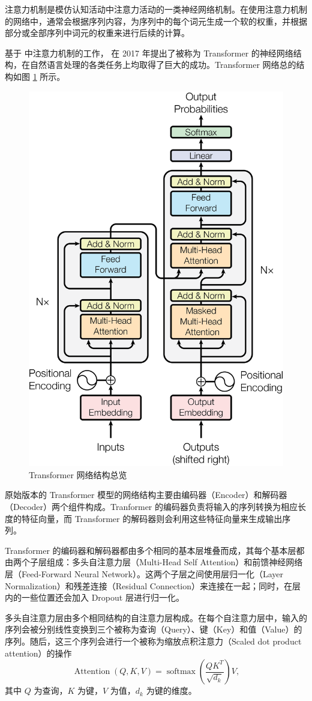 注意力机制是模仿认知活动中注意力活动的一类神经网络机制。在使用注意力机制的网络中，通常会根据序列内容，为序列中的每个词元生成一个软的权重，并根据部分或全部序列中词元的权重来进行后续的计算。

基于 \citet{bahdanau2016neural} 中注意力机制的工作，\citet{Vaswani2017AttentionIA} 在 2017 年提出了被称为 Transformer 的神经网络结构，在自然语言处理的各类任务上均取得了巨大的成功。Transformer 网络总的结构如图 \ref{fig:transformer_overview} 所示。

\begin{figure}[h]
  \centering
  \includegraphics[width=0.5\linewidth]{figures/Transformer-Arch.png}
  \caption{Transformer 网络结构总览\cite{Vaswani2017AttentionIA}}
  \label{fig:transformer_overview}
\end{figure}


原始版本的 Transformer 模型的网络结构主要由编码器（Encoder）和解码器（Decoder）两个组件构成。Tranformer 的编码器负责将输入的序列转换为相应长度的特征向量，而 Transformer 的解码器则会利用这些特征向量来生成输出序列。

Transformer 的编码器和解码器都由多个相同的基本层堆叠而成，其每个基本层都由两个子层组成：多头自注意力层（Multi-Head Self Attention）和前馈神经网络层（Feed-Forward Neural Network）。这两个子层之间使用层归一化（Layer Normalization）和残差连接（Residual Connection）来连接在一起；同时，在层内的一些位置还会加入 Dropout 层进行归一化。

多头自注意力层由多个相同结构的自注意力层构成。在每个自注意力层中，输入的序列会被分别线性变换到三个被称为查询（Query）、键（Key）和值（Value）的序列。随后，这三个序列会进行一个被称为缩放点积注意力（Scaled dot product attention）的操作
$$
\operatorname{Attention}(Q, K, V) = \operatorname{softmax}\left(\frac{Q K^T}{\sqrt{d_k}}\right)V,
$$
其中 $Q$ 为查询，$K$ 为键，$V$ 为值，$d_k$ 为键的维度。

